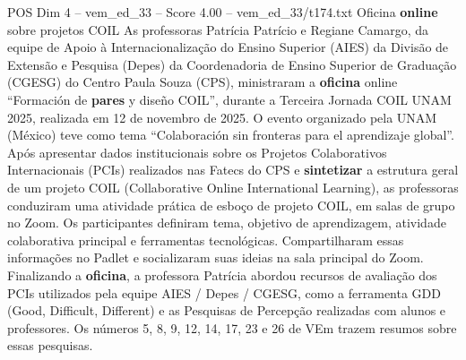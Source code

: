 \begin{textsample}{POS Dim 4 – vem\_ed\_33 – Score 4.00 – vem\_ed\_33/t174.txt}  \label{ex:f4_pos_125}
Oficina \textbf{online} sobre projetos COIL As professoras Patrícia Patrício e Regiane Camargo, da equipe de Apoio à Internacionalização do Ensino Superior (AIES) da Divisão de Extensão e Pesquisa (Depes) da Coordenadoria de Ensino Superior de Graduação (CGESG) do Centro Paula Souza (CPS), ministraram a \textbf{oficina} online “Formación de \textbf{pares} y diseño COIL”, durante a Terceira Jornada COIL UNAM 2025, realizada em 12 de novembro de 2025.
O evento organizado pela UNAM (México) teve como tema “Colaboración sin fronteras para el aprendizaje global”.
Após apresentar dados institucionais sobre os Projetos Colaborativos Internacionais (PCIs) realizados nas Fatecs do CPS e \textbf{sintetizar} a estrutura geral de um projeto COIL (Collaborative Online International Learning), as professoras conduziram uma atividade prática de esboço de projeto COIL, em salas de grupo no Zoom.
Os participantes definiram tema, objetivo de aprendizagem, atividade colaborativa principal e ferramentas tecnológicas.
Compartilharam essas informações no Padlet e socializaram suas ideias na sala principal do Zoom.
Finalizando a \textbf{oficina}, a professora Patrícia abordou recursos de avaliação dos PCIs utilizados pela equipe AIES / Depes / CGESG, como a ferramenta GDD (Good, Difficult, Different) e as Pesquisas de Percepção realizadas com alunos e professores.
Os números 5, 8, 9, 12, 14, 17, 23 e 26 de VEm trazem resumos sobre essas pesquisas.

\end{textsample}
